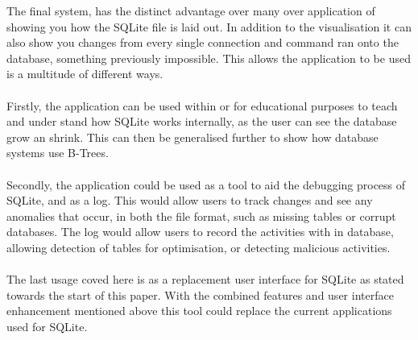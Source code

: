 The final system, has the distinct advantage over many over application of showing you how the SQLite file is laid out. In addition to the visualisation it can also show you changes from every single connection and command ran onto the database, something previously impossible. This allows the application to be used is a multitude of different ways.
\\\\
Firstly, the application can be used within or for educational purposes to teach and under stand how SQLite works internally, as the user can see the database grow an shrink. This can then be generalised further to show how database systems use B-Trees. 
\\\\
Secondly, the application could be used as a tool to aid the debugging process of SQLite, and as a log. This would allow users to track changes and see any anomalies that occur, in both the file format, such as missing tables or corrupt databases. The log would allow users to record the activities with in database, allowing detection of tables for optimisation, or detecting malicious activities.
\\\\
The last usage coved here is as a replacement user interface for SQLite as stated towards the start of this paper. With the combined features and user interface enhancement mentioned above this tool could replace the current applications used for SQLite. 